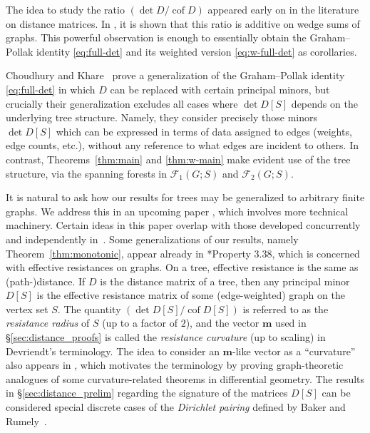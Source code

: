 \documentclass[12pt]{amsart}
\theoremstyle{definition}
\newcommand{\boldm}{\mathbf{m}}
\DeclareMathOperator{\cof}{cof}
\newcommand{\forests}{\mathcal{F}}
\begin{document}

The idea to study the ratio $({\det D}/{\cof D})$ appeared early on in the literature on distance matrices.
In \cite{graham-hoffman-hosoya}, it is shown that this ratio is additive on wedge sums of graphs.
This powerful observation is enough to essentially obtain the Graham--Pollak identity \eqref{eq:full-det} and its weighted version \eqref{eq:w-full-det} as corollaries.

Choudhury and Khare~\cite{choudhury-khare} prove a generalization of the Graham--Pollak identity \eqref{eq:full-det} in which $D$ can be replaced with certain principal minors, but crucially their generalization excludes all cases where $\det D[S]$ depends on the underlying tree structure.
Namely, they consider precisely those minors $\det D[S]$ which can be expressed in terms of data assigned to edges (weights, edge counts, etc.), without any reference to what edges are incident to others.
In contrast, Theorems~\ref{thm:main} and \ref{thm:w-main} make evident use of the tree structure, via the spanning forests in $\forests_1(G; S)$ and $\forests_2(G; S)$.

It is natural to ask how our results for trees may be generalized to arbitrary finite graphs. We address this in an upcoming paper \cite{richman-shokrieh-wu}, which involves more technical machinery.
Certain ideas in this paper overlap with those developed concurrently and independently in~\cites{devriendt-thesis}.
Some generalizations of our results, namely Theorem~\ref{thm:monotonic}, appear already in \cite{devriendt-thesis}*{Property 3.38}, which is concerned with effective resistances on graphs.
On a tree, effective resistance is the same as (path-)distance.
If $D$ is the distance matrix of a tree, then any principal minor $D[S]$ is the effective resistance matrix of some (edge-weighted) graph on the vertex set $S$.
The quantity $(\det D[S] / \cof D[S])$ is referred to as the {\em resistance radius} of $S$ (up to a factor of $2$),
and the vector $\boldm$ used in \S\ref{sec:distance_proofs} is called the {\em resistance curvature} (up to scaling) in Devriendt's terminology.
The idea to consider an $\boldm$-like vector as a ``curvature'' also appears in \cite{steinerberger}, which motivates the terminology by proving graph-theoretic analogues of some curvature-related theorems in differential geometry. 
The results in \S\ref{sec:distance_prelim} regarding the signature of the matrices $D[S]$ can be considered special discrete cases of the {\em Dirichlet pairing} defined by
Baker and Rumely~\cite{baker-rumely}.
\end{document}
